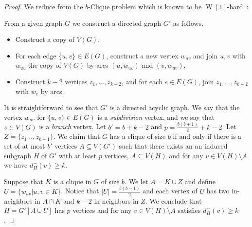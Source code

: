 \documentclass[11pt,a4paper]{article}
\DeclareMathOperator{\operatorClassW}{W}
\newcommand{\classW}[1]{\ensuremath{\operatorClassW[#1]}}
\begin{document}
\begin{proof}
We reduce from the {\sc $b$-Clique} problem which is known to be \classW1-hard~\cite{downey-fellows-book}:

\begin{center}
\noindent{}
\end{center}


From a given graph $G$ we construct a directed graph $G'$ as follows.
\begin{itemize}
\item Construct a copy of $V(G)$.
\item For each edge $\{u,v\}\in E(G)$, construct a new vertex $w_{uv}$ and join $u,v$  with $w_{uv}$  the copy of $V(G)$
    by arcs $(u,w_{uv})$ and $(v,w_{uv})$.
\item Construct $k-2$ vertices $z_1,\ldots,z_{k-2}$, and for each $e\in E(G)$, join $z_1,\ldots,z_{k-2}$ with $w_e$ by
    arcs.
\end{itemize}
It is straightforward to see that $G'$ is a directed acyclic graph. We say that the vertex $w_{uv}$ for $\{u,v\}\in E(G)$ is a
\emph{subdivision} vertex, and we say that $v\in V(G)$  is a \emph{branch} vertex. Let $b'=b+k-2$ and
$p=\frac{b(b+1)}{2}+k-2$. Let $Z=\{z_1\ldots,z_{k-1}\}$. We claim that $G$ has a clique of size $b$ if and only if there is a
set of at most $b'$ vertices $A\subseteq V(G')$ such that there exists an an induced subgraph $H$ of $G'$ with at least $p$
vertices, $A\subseteq V(H)$ and for any $v\in V(H)\setminus A$ we have  $d_H^-(v)\geq k$.

Suppose that $K$ is a clique in $G$ of size $b$. We let $A=K\cup Z$ and define $U=\{w_{uv}|u,v\in K\}$. Notice that
$|U|=\frac{b(b-1)}{2}$ and each vertex of $U$ has two in-neighbors in $A\cap K$ and $k-2$ in-neighbors in $Z$. We conclude
that $H=G'[A\cup U]$ has $p$ vertices and  for any $v\in V(H)\setminus A$ satisfies $d_H^-(v)\geq k$.


\end{proof}
\end{document}
